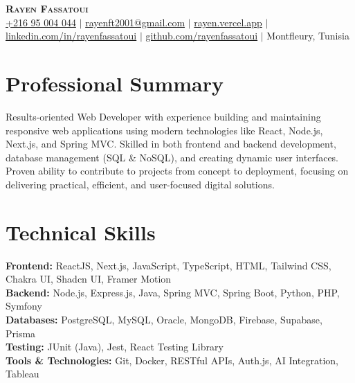 \documentclass[letterpaper,11pt]{article}
\begin{document}
\begin{center}
    \textbf{\Huge \scshape Rayen Fassatoui} \\ \vspace{3pt}
    \small
    \faMobile* \hspace{.5pt} \href{tel:+21695004044}{+216 95 004 044} $|$
    \faEnvelope \hspace{.5pt} \href{mailto:rayenft2001@gmail.com}{rayenft2001@gmail.com} $|$
    \faGlobe \hspace{.5pt} \href{https://rayen.vercel.app}{rayen.vercel.app} $|$
    \faLinkedin \hspace{.5pt} \href{https://linkedin.com/in/rayenfassatoui}{linkedin.com/in/rayenfassatoui} $|$
    \faGithub \hspace{.5pt} \href{https://github.com/rayenfassatoui}{github.com/rayenfassatoui} $|$
    \faMapMarker* \hspace{.5pt} Montfleury, Tunisia
\end{center}

\section{Professional Summary}
\small{
Results-oriented Web Developer with experience building and maintaining responsive web applications using modern technologies like React, Node.js, Next.js, and Spring MVC. Skilled in both frontend and backend development, database management (SQL & NoSQL), and creating dynamic user interfaces. Proven ability to contribute to projects from concept to deployment, focusing on delivering practical, efficient, and user-focused digital solutions.
}

\section{Technical Skills}
\begin{itemize}[leftmargin=0.15in, label={}]
    \small{\item{
        \textbf{Frontend:} ReactJS, Next.js, JavaScript, TypeScript, HTML, Tailwind CSS, Chakra UI, Shadcn UI, Framer Motion \\
        \textbf{Backend:} Node.js, Express.js, Java, Spring MVC, Spring Boot, Python, PHP, Symfony \\
        \textbf{Databases:} PostgreSQL, MySQL, Oracle, MongoDB, Firebase, Supabase, Prisma \\
        \textbf{Testing:} JUnit (Java), Jest, React Testing Library \\
        \textbf{Tools \& Technologies:} Git, Docker, RESTful APIs, Auth.js, AI Integration, Tableau \\
    }}
\end{itemize}
\vspace{-5pt}
\end{document}
